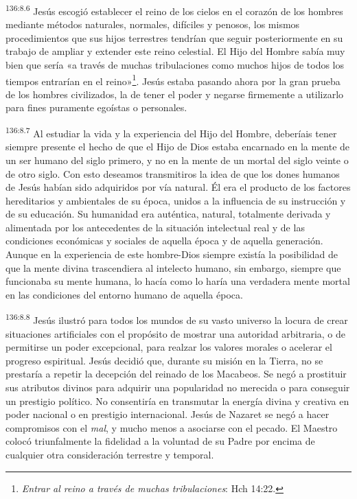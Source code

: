 \par 
\textsuperscript{136:8.6} Jesús escogió establecer el reino de los cielos en el corazón de los hombres mediante métodos naturales, normales, difíciles y penosos, los mismos procedimientos que sus hijos terrestres tendrían que seguir posteriormente en su trabajo de ampliar y extender este reino celestial. El Hijo del Hombre sabía muy bien que sería «a través de muchas tribulaciones como muchos hijos de todos los tiempos entrarían en el reino»\footnote{\textit{Entrar al reino a través de muchas tribulaciones}: Hch 14:22.}. Jesús estaba pasando ahora por la gran prueba de los hombres civilizados, la de tener el poder y negarse firmemente a utilizarlo para fines puramente egoístas o personales.

\par 
\textsuperscript{136:8.7} Al estudiar la vida y la experiencia del Hijo del Hombre, deberíais tener siempre presente el hecho de que el Hijo de Dios estaba encarnado en la mente de un ser humano del siglo primero, y no en la mente de un mortal del siglo veinte o de otro siglo. Con esto deseamos transmitiros la idea de que los dones humanos de Jesús habían sido adquiridos por vía natural. Él era el producto de los factores hereditarios y ambientales de su época, unidos a la influencia de su instrucción y de su educación. Su humanidad era auténtica, natural, totalmente derivada y alimentada por los antecedentes de la situación intelectual real y de las condiciones económicas y sociales de aquella época y de aquella generación. Aunque en la experiencia de este hombre-Dios siempre existía la posibilidad de que la mente divina trascendiera al intelecto humano, sin embargo, siempre que funcionaba su mente humana, lo hacía como lo haría una verdadera mente mortal en las condiciones del entorno humano de aquella época.

\par 
\textsuperscript{136:8.8} Jesús ilustró para todos los mundos de su vasto universo la locura de crear situaciones artificiales con el propósito de mostrar una autoridad arbitraria, o de permitirse un poder excepcional, para realzar los valores morales o acelerar el progreso espiritual. Jesús decidió que, durante su misión en la Tierra, no se prestaría a repetir la decepción del reinado de los Macabeos. Se negó a prostituir sus atributos divinos para adquirir una popularidad no merecida o para conseguir un prestigio político. No consentiría en transmutar la energía divina y creativa en poder nacional o en prestigio internacional. Jesús de Nazaret se negó a hacer compromisos con el \textit{mal}, y mucho menos a asociarse con el pecado. El Maestro colocó triunfalmente la fidelidad a la voluntad de su Padre por encima de cualquier otra consideración terrestre y temporal.

